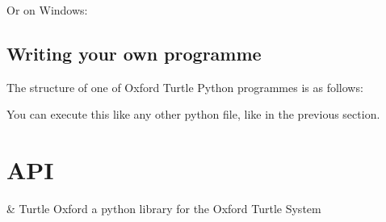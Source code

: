 \documentclass[letterpaper,10pt,english]{sphinxmanual}
\begin{document}
\sphinxAtStartPar
Or on Windows:

\begin{sphinxVerbatim}[commandchars=\\\{\}]
 
\end{sphinxVerbatim}


\section{Writing your own programme}
\label{\detokenize{usage:writing-your-own-programme}}
\sphinxAtStartPar
The structure of one of Oxford Turtle Python programmes is as follows:

\begin{sphinxVerbatim}[commandchars=\\\{\}]
     
              

       
     
\end{sphinxVerbatim}

\sphinxAtStartPar
You can execute this like any other python file, like in the previous section.

\sphinxstepscope


\chapter{API}
\label{\detokenize{api:api}}\label{\detokenize{api::doc}}

\begin{savenotes}\sphinxattablestart
\sphinxthistablewithglobalstyle
\sphinxthistablewithnovlinesstyle
\centering
\begin{tabulary}{\linewidth}[t]{}
\sphinxtoprule
\sphinxtableatstartofbodyhook
\sphinxAtStartPar
{\hyperref[\detokenize{generated/turtle_oxford:module-turtle_oxford}]{}}
&
\sphinxAtStartPar
Turtle Oxford \sphinxhyphen{} a python library for the Oxford Turtle System
\\
\sphinxbottomrule
\end{tabulary}
\sphinxtableafterendhook\par
\sphinxattableend\end{savenotes}
\end{document}
